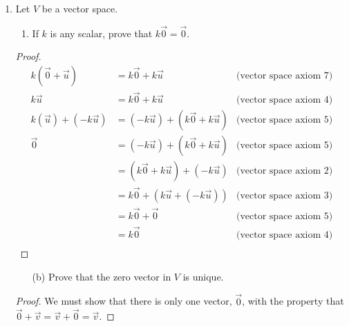 \documentclass[12pt]{article}
\begin{document}
\begin{enumerate}
\begin{proof}
                      Therefore $W$ is a subspace of $F(-\infty, \infty)$ and hence is a vector space.
              \end{proof}
        \item
              Let $V$ be a vector space.
              \begin{enumerate}
                      \item If $k$ is any scalar, prove that $k\vec{0} = \vec{0}$.
              \end{enumerate}
              \begin{proof}
                      \begin{align*}
                              k(\vec{0} + \vec{u})
                               & = k\vec{0} + k\vec{u}                 & \textrm{(vector space axiom 7)} \\
                              k\vec{u}
                               & = k\vec{0} + k\vec{u}                 & \textrm{(vector space axiom 4)} \\
                              k(\vec{u}) + (-k\vec{u})
                               & = (-k\vec{u}) + (k\vec{0} + k\vec{u}) & \textrm{(vector space axiom 5)} \\
                              \vec{0}
                               & = (-k\vec{u}) + (k\vec{0} + k\vec{u}) & \textrm{(vector space axiom 5)} \\
                               & = (k\vec{0} + k\vec{u}) + (-k\vec{u}) & \textrm{(vector space axiom 2)} \\
                               & = k\vec{0} + (k\vec{u} + (-k\vec{u})) & \textrm{(vector space axiom 3)} \\
                               & = k\vec{0} + \vec{0}                  & \textrm{(vector space axiom 5)} \\
                               & = k\vec{0}                            & \textrm{(vector space axiom 4)} \\
                      \end{align*}
              \end{proof}
              \begin{enumerate}
                      \item[(b)] Prove that the zero vector in $V$ is unique.
              \end{enumerate}
              \begin{proof}
                      We must show that there is only one vector, $\vec{0}$, with the property that \\
                      $\vec{0} + \vec{v} = \vec{v} + \vec{0} = \vec{v}$.


\end{proof}
\end{enumerate}
\end{document}
